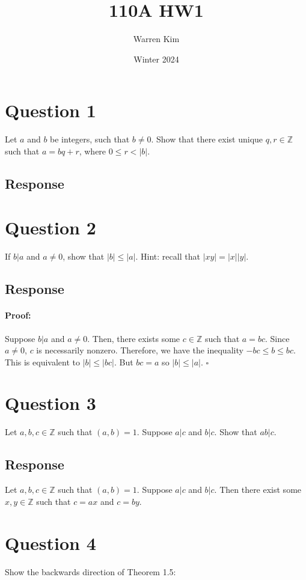 \documentclass [12pt] {article}
\title{110A HW1}
\author{Warren Kim}
\date{Winter 2024}
\newcommand{\Z}{\mathbb{Z}}
\newenvironment{proof}{\paragraph{Proof:}}{\hfill$\square$}
\begin{document}
\maketitle

\section*{Question 1}
Let $a$ and $b$ be integers, such that $b \neq 0$. Show that there exist unique $q, r \in \Z$ such 
that $a = bq + r$, where $0 \leq r < |b|$. 
\subsection*{Response}
\newpage

\section*{Question 2}
If $b | a$ and $a \neq 0$, show that $|b| \leq |a|$.  Hint: recall that $|xy| = |x||y|$.

\subsection*{Response}
\begin{proof}
    Suppose $b | a$ and $a \neq 0$. Then, there exists some $c \in \Z$ such that $a = bc$. Since
    $a \neq 0$, $c$ is necessarily nonzero. Therefore, we have the inequality $-bc \leq b \leq bc$.
    This is equivalent to $|b| \leq |bc|$. But $bc = a$ so $|b| \leq |a|$.
\end{proof}
\newpage

\section*{Question 3}
Let $a,b,c\in \Z$ such that $(a,b)=1$. Suppose $a|c$ and $b|c$. Show that $ab|c$. 

\subsection*{Response}
Let $a, b, c \in \Z$ such that $(a, b) = 1$. Suppose $a | c$ and $b | c$. Then there exist some
$x, y \in \Z$ such that $c = ax$ and $c = by$.
\newpage

\section*{Question 4}
Show the backwards direction of Theorem 1.5:
\end{document}
